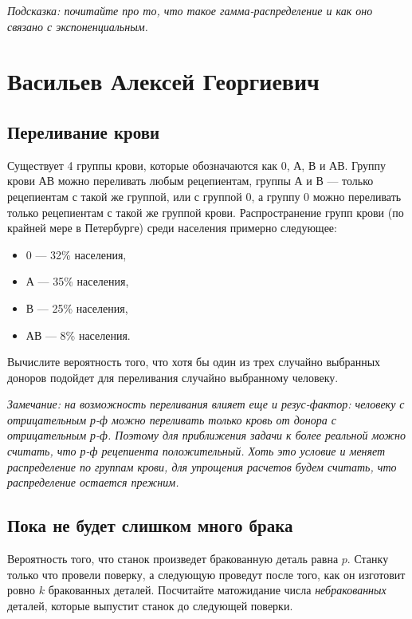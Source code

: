 \documentclass[12pt]{article}
\begin{document}
\emph{Подсказка: почитайте про то, что такое гамма-распределение и как оно связано с экспоненциальным.}

\newpage
\section{Васильев Алексей Георгиевич}

\subsection{Переливание крови}
Существует 4 группы крови, которые обозначаются как 0, А, В и АВ. Группу крови АВ можно переливать любым рецепиентам, группы А и В --- только рецепиентам с такой же группой, или с группой 0, а группу 0 можно переливать только рецепиентам с такой же группой крови. Распространение групп крови (по крайней мере в Петербурге) среди населения примерно следующее:
\begin{itemize}
    \item 0 --- 32\% населения,
    \item А --- 35\% населения,
    \item В --- 25\% населения,
    \item АВ --- 8\% населения.
\end{itemize}
Вычислите вероятность того, что хотя бы один из трех случайно выбранных доноров подойдет для переливания случайно выбранному человеку. 

\emph{Замечание: на возможность переливания влияет еще и резус-фактор: человеку с отрицательным р-ф можно переливать только кровь от донора с отрицательным р-ф. Поэтому для приближения задачи к более реальной можно считать, что р-ф рецепиента положительный. Хоть это условие и меняет распределение по группам крови, для упрощения расчетов будем считать, что распределение остается прежним.}

\subsection{Пока не будет слишком много брака}
Вероятность того, что станок произведет бракованную деталь равна $p$. Станку только что провели поверку, а следующую проведут после того, как он изготовит ровно $k$ бракованных деталей. Посчитайте матожидание числа \emph{небракованных} деталей, которые выпустит станок до следующей поверки.
\end{document}
